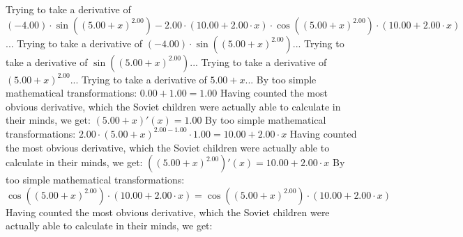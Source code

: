 \documentclass{article}
\begin{document}
\newline
Trying to take a derivative of ${{\left({-4.00}\right) \cdot  \sin {\left({\left({{5.00} + {x}}\right) ^ {2.00}}\right)} } - {{2.00} \cdot {\left({{10.00} + {{2.00} \cdot {x}}}\right) \cdot { \cos {\left({\left({{5.00} + {x}}\right) ^ {2.00}}\right)}  \cdot \left({{10.00} + {{2.00} \cdot {x}}}\right)}}}}$...\newline
\newline
Trying to take a derivative of ${\left({-4.00}\right) \cdot  \sin {\left({\left({{5.00} + {x}}\right) ^ {2.00}}\right)} }$...\newline
\newline
Trying to take a derivative of $ \sin {\left({\left({{5.00} + {x}}\right) ^ {2.00}}\right)} $...\newline
\newline
Trying to take a derivative of ${\left({{5.00} + {x}}\right) ^ {2.00}}$...\newline
\newline
Trying to take a derivative of ${{5.00} + {x}}$...\newline
\newline
By too simple mathematical transformations:
 ${{0.00} + {1.00}} = {1.00}$ 
 \newline
 \newline 
Having counted the most obvious derivative, which the Soviet children were actually able to calculate in their minds, we get:
$({{5.00} + {x}})'(x) = {1.00}$\newline
\newline
By too simple mathematical transformations:
 ${{{2.00} \cdot {\left({{5.00} + {x}}\right) ^ {{2.00} - {1.00}}}} \cdot {1.00}} = {{10.00} + {{2.00} \cdot {x}}}$ 
 \newline
 \newline 
Having counted the most obvious derivative, which the Soviet children were actually able to calculate in their minds, we get:
$({\left({{5.00} + {x}}\right) ^ {2.00}})'(x) = {{10.00} + {{2.00} \cdot {x}}}$\newline
\newline
By too simple mathematical transformations:
 ${ \cos {\left({\left({{5.00} + {x}}\right) ^ {2.00}}\right)}  \cdot \left({{10.00} + {{2.00} \cdot {x}}}\right)} = { \cos {\left({\left({{5.00} + {x}}\right) ^ {2.00}}\right)}  \cdot \left({{10.00} + {{2.00} \cdot {x}}}\right)}$ 
 \newline
 \newline 
Having counted the most obvious derivative, which the Soviet children were actually able to calculate in their minds, we get:
\end{document}
